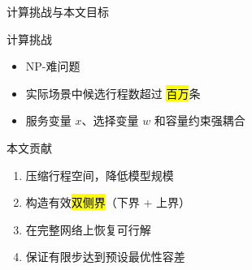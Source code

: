 \begin{frame}{计算挑战与本文目标}
\begin{block}{计算挑战}
\begin{itemize}
    \item NP-难问题
    \item 实际场景中候选行程数超过 \hl{百万}条
    \item 服务变量 $x$、选择变量 $w$ 和容量约束强耦合
\end{itemize}
\end{block}

\vspace{0.3cm}
\begin{block}{本文贡献}
\begin{enumerate}
    \item 压缩行程空间，降低模型规模
    \item 构造有效\hl{双侧界}（下界 + 上界）
    \item 在完整网络上恢复可行解
    \item 保证有限步达到预设最优性容差
\end{enumerate}
\end{block}
\end{frame}
